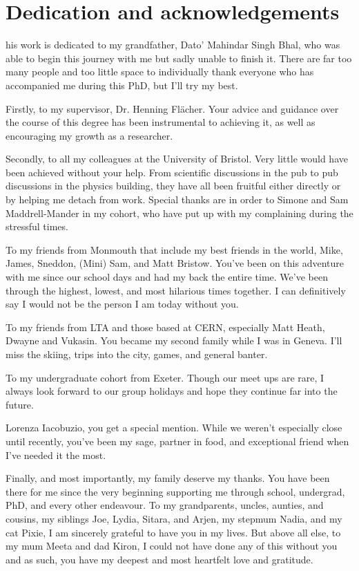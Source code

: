 %
%

\chapter*{Dedication and acknowledgements}
\begin{SingleSpace}
his work is dedicated to my grandfather, Dato' Mahindar Singh Bhal, who was able to begin this journey with me but sadly unable to finish it. There are far too many people and too little space to individually thank everyone who has accompanied me during this PhD, but I'll try my best.

Firstly, to my supervisor, Dr. Henning Fl\"{a}cher. Your advice and guidance over the course of this degree has been instrumental to achieving it, as well as encouraging my growth as a researcher.

Secondly, to all my colleagues at the University of Bristol. Very little would have been achieved without your help. From scientific discussions in the pub to pub discussions in the physics building, they have all been fruitful either directly or by helping me detach from work. Special thanks are in order to Simone and Sam Maddrell-Mander in my cohort, who have put up with my complaining during the stressful times.

To my friends from Monmouth that include my best friends in the world, Mike, James, Sneddon, (Mini) Sam, and Matt Bristow. You've been on this adventure with me since our school days and had my back the entire time. We've been through the highest, lowest, and most hilarious times together. I can definitively say I would not be the person I am today without you.

To my friends from LTA and those based at CERN, especially Matt Heath, Dwayne and Vukasin. You became my second family while I was in Geneva. I'll miss the skiing, trips into the city, games, and general banter.

To my undergraduate cohort from Exeter. Though our meet ups are rare, I always look forward to our group holidays and hope they continue far into the future.

Lorenza Iacobuzio, you get a special mention. While we weren't especially close until recently, you've been my sage, partner in food, and exceptional friend when I've needed it the most.

Finally, and most importantly, my family deserve my thanks. You have been there for me since the very beginning supporting me through school, undergrad, PhD, and every other endeavour. To my grandparents, uncles, aunties, and cousins, my siblings Joe, Lydia, Sitara, and Arjen, my stepmum Nadia, and my cat Pixie, I am sincerely grateful to have you in my lives. But above all else, to my mum Meeta and dad Kiron, I could not have done any of this without you and as such, you have my deepest and most heartfelt love and gratitude.

\end{SingleSpace}
\clearpage
